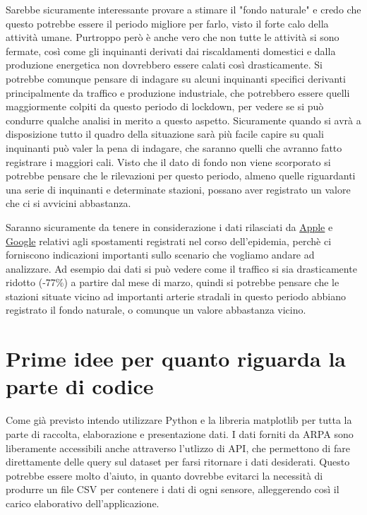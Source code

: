 \documentclass{article}
\begin{document}
Sarebbe sicuramente interessante provare a stimare il "fondo naturale" e credo che questo potrebbe essere il periodo migliore per farlo, visto il forte calo della attività umane. Purtroppo però è anche vero che non tutte le attività si sono fermate, così come gli inquinanti derivati dai riscaldamenti domestici e dalla produzione energetica non dovrebbero essere calati così drasticamente. Si potrebbe comunque pensare di indagare su alcuni inquinanti specifici derivanti principalmente da traffico e produzione industriale, che potrebbero essere quelli maggiormente colpiti da questo periodo di lockdown, per vedere se si può condurre qualche analisi in merito a questo aspetto. Sicuramente quando si avrà a disposizione tutto il quadro della situazione sarà più facile capire su quali inquinanti può valer la pena di indagare, che saranno quelli che avranno fatto registrare i maggiori cali.
Visto che il dato di fondo non viene scorporato si potrebbe pensare che le rilevazioni per questo periodo, almeno quelle riguardanti una serie di inquinanti e determinate stazioni, possano aver registrato un valore che ci si avvicini abbastanza.

Saranno sicuramente da tenere in considerazione i dati rilasciati da \href{https://www.apple.com/covid19/mobility}{Apple} e \href{https://www.google.com/covid19/mobility/}{Google} relativi agli spostamenti registrati nel corso dell'epidemia, perchè ci forniscono indicazioni importanti sullo scenario che vogliamo andare ad analizzare. Ad esempio dai dati si può vedere come il traffico si sia drasticamente ridotto (-77\%) a partire dal mese di marzo, quindi si potrebbe pensare che le stazioni situate vicino ad importanti arterie stradali in questo periodo abbiano registrato il fondo naturale, o comunque un valore abbastanza vicino.  


\section{Prime idee per quanto riguarda la parte di codice}
Come già previsto intendo utilizzare Python e la libreria matplotlib per tutta la parte di raccolta, elaborazione e presentazione dati. I dati forniti da ARPA sono liberamente accessibili anche attraverso l'utlizzo di API, che permettono di fare direttamente delle query sul dataset per farsi ritornare i dati desiderati. Questo potrebbe essere molto d'aiuto, in quanto dovrebbe evitarci la necessità di produrre un file CSV per contenere i dati di ogni sensore, alleggerendo così il carico elaborativo dell'applicazione.
\end{document}
